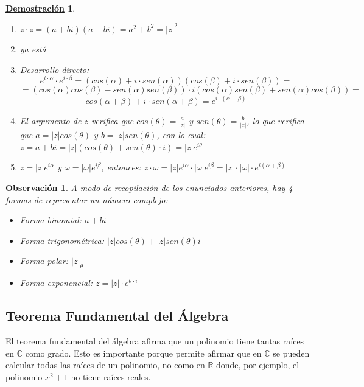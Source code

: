 \documentclass[10pt,a4paper,openright]{book}
\theoremstyle{break}
\newtheorem*{demo}{\underline{Demostración}}
\newtheorem{obs}{\underline{Observación}}[chapter]
\begin{document}
\begin{demo}
\begin{enumerate}
\item $z\cdot \bar{z}=(a+bi)(a-bi)=a^2+b^2=|z|^2$
\item ya está
\item Desarrollo directo:
$$e^{i\cdot \alpha}\cdot e^{i\cdot \beta}=\left( cos(\alpha)+i\cdot sen(\alpha)\right) \left( cos(\beta)+ i\cdot sen(\beta)\right)=$$
$$=\left( cos(\alpha)cos(\beta)-sen(\alpha)sen(\beta)\right)\cdot i\left( cos(\alpha)sen(\beta)+sen(\alpha)cos(\beta)\right)=$$
$$cos(\alpha + \beta)+ i\cdot sen(\alpha + \beta)= e^{i\cdot(\alpha + \beta)}$$

\item El argumento de $z$ verifica que $cos(\theta)=\frac{a}{|z|}$ y $sen(\theta)=\frac{b}{|z|}$, lo que verifica que $a=|z|cos(\theta)$ y $b=|z|sen(\theta)$, con lo cual: $z=a+bi=|z|(cos(\theta)+sen(\theta)\cdot i)=|z|e^{i\theta}$

\item $z=|z|e^{i\alpha}$ y $\omega=|\omega|e^{i\beta}$, entonces: $z\cdot \omega=|z|e^{i\alpha}\cdot |\omega|e^{i\beta}=|z|\cdot |\omega|\cdot e^{i(\alpha +\beta)}$
\end{enumerate}
\end{demo}

\begin{obs}
A modo de recopilación de los enunciados anteriores, hay 4 formas de representar un número complejo:
\begin{itemize}
\item Forma binomial: $a+bi$
\item Forma trigonométrica: $|z|cos(\theta)+ |z|sen(\theta)i$
\item Forma polar: $|z|_\theta$
\item Forma exponencial: $z=|z|\cdot e^{\theta\cdot i}$
\end{itemize}
\end{obs}



\subsection{Teorema Fundamental del Álgebra}
El teorema fundamental del álgebra afirma que un polinomio tiene tantas raíces en $\mathbb C$ como grado. Esto es importante porque permite afirmar que en $\mathbb C$ se pueden calcular todas las raíces de un polinomio, no como en $\mathbb R$ donde, por ejemplo, el polinomio $x^2+1$ no tiene raíces reales.
\end{document}
